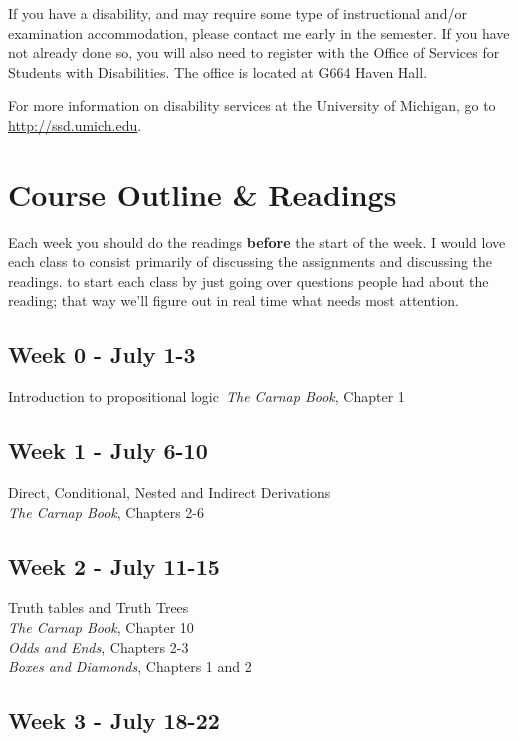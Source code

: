 \documentclass[10pt]{article}
\begin{document}
If you have a disability, and may require some type of instructional and\slash or examination accommodation, please contact me early in the semester. If you have not already done so, you will also need to register with the Office of Services for Students with Disabilities. The office is located at G664 Haven Hall. \smallskip

For more information on disability services at the University of Michigan, go to \url{http://ssd.umich.edu}. 

\newpage
\section*{Course Outline \& Readings}

Each week you should do the readings \textbf{before} the start of the week. I would love each class to consist primarily of discussing the assignments and discussing the readings. to start each class by just going over questions people had about the reading; that way we'll figure out in real time what needs most attention. 

\subsection*{Week 0 - July 1-3}

Introduction to propositional logic\
\textit{The Carnap Book}, Chapter 1

\subsection*{Week 1 - July 6-10}

Direct, Conditional, Nested and Indirect Derivations \\
\textit{The Carnap Book}, Chapters 2-6

\subsection*{Week 2 - July 11-15}

Truth tables and Truth Trees \\
\textit{The Carnap Book}, Chapter 10 \\
\textit{Odds and Ends}, Chapters 2-3 \\
\textit{Boxes and Diamonds}, Chapters 1 and 2

\subsection*{Week 3 - July 18-22}
\end{document}
